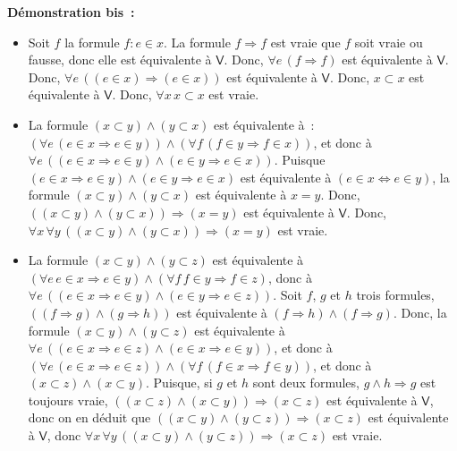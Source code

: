 \noindent \textbf{Démonstration bis :} 
\begin{itemize}[nosep]
    \item Soit $f$ la formule $f: e \in x$. 
        La formule $f \Rightarrow f$ est vraie que $f$ soit vraie ou fausse, donc elle est équivalente à $\mathsf{V}$. 
        Donc, $\forall e \, (f \Rightarrow f)$ est équivalente à $\mathsf{V}$.
        Donc, $\forall e \, ((e \in x) \Rightarrow (e \in x))$ est équivalente à $\mathsf{V}$. 
        Donc, $x \subset x$ est équivalente à $\mathsf{V}$. 
        Donc, $\forall x \, x \subset x$ est vraie. 
    \item La formule $(x \subset y) \wedge (y \subset x)$ est équivalente à : $(\forall e \, (e \in x \Rightarrow e \in y)) \wedge (\forall f \, (f \in y \Rightarrow f \in x))$, et donc à $\forall e \, ((e \in x \Rightarrow e \in y) \wedge (e \in y \Rightarrow e \in x))$. 
        Puisque $(e \in x \Rightarrow e \in y) \wedge (e \in y \Rightarrow e \in x)$ est équivalente à $(e \in x \Leftrightarrow e \in y)$, la formule $(x \subset y) \wedge (y \subset x)$ est équivalente à $x = y$.
        Donc, $((x \subset y) \wedge (y \subset x)) \Rightarrow (x = y)$ est équivalente à $\mathsf{V}$. 
        Donc, $\forall x \, \forall y \, ((x \subset y) \wedge (y \subset x)) \Rightarrow (x = y)$ est vraie. 
    \item La formule $(x \subset y) \wedge (y \subset z)$ est équivalente à $(\forall e \, e \in x \Rightarrow e \in y) \wedge (\forall f \, f \in y \Rightarrow f \in z)$, donc à $\forall e \, ((e \in x \Rightarrow e \in y) \wedge (e \in y \Rightarrow e \in z))$. 
        Soit $f$, $g$ et $h$ trois formules, $((f \Rightarrow g) \wedge (g \Rightarrow h))$ est équivalente à $(f \Rightarrow h) \wedge (f \Rightarrow g)$.
        Donc, la formule $(x \subset y) \wedge (y \subset z)$ est équivalente à $\forall e \, ((e \in x \Rightarrow e \in z) \wedge (e \in x \Rightarrow e \in y))$, et donc à $(\forall e \, (e \in x \Rightarrow e \in z)) \wedge (\forall f \, (f \in x \Rightarrow f \in y))$, et donc à $(x \subset z) \wedge (x \subset y)$. 
        Puisque, si $g$ et $h$ sont deux formules, $g \wedge h \Rightarrow g$ est toujours vraie, $((x \subset z) \wedge (x \subset y)) \Rightarrow (x \subset z)$ est équivalente à $\mathsf{V}$, donc on en déduit que $((x \subset y) \wedge (y \subset z)) \Rightarrow (x \subset z)$ est équivalente à $\mathsf{V}$, donc $\forall x \, \forall y \, ((x \subset y) \wedge (y \subset z)) \Rightarrow (x \subset z)$ est vraie.
\end{itemize}

